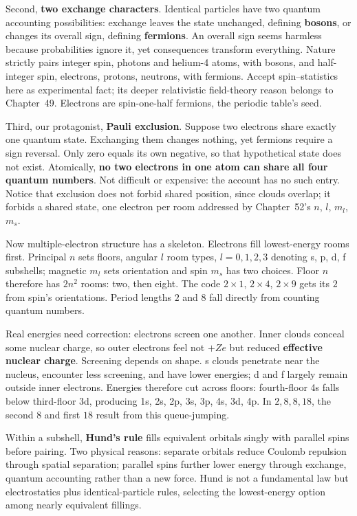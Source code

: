 Second, \textbf{two exchange characters}. Identical particles have two quantum accounting possibilities: exchange leaves the state unchanged, defining \textbf{bosons}, or changes its overall sign, defining \textbf{fermions}. An overall sign seems harmless because probabilities ignore it, yet consequences transform everything. Nature strictly pairs integer spin, photons and helium-4 atoms, with bosons, and half-integer spin, electrons, protons, neutrons, with fermions. Accept spin--statistics here as experimental fact; its deeper relativistic field-theory reason belongs to Chapter~49. Electrons are spin-one-half fermions, the periodic table's seed.

Third, our protagonist, \textbf{Pauli exclusion}. Suppose two electrons share exactly one quantum state. Exchanging them changes nothing, yet fermions require a sign reversal. Only zero equals its own negative, so that hypothetical state does not exist. Atomically, \textbf{no two electrons in one atom can share all four quantum numbers}. Not difficult or expensive: the account has no such entry. Notice that exclusion does not forbid shared position, since clouds overlap; it forbids a shared state, one electron per room addressed by Chapter~52's \(n\), \(l\), \(m_l\), \(m_s\).

Now multiple-electron structure has a skeleton. Electrons fill lowest-energy rooms first. Principal \(n\) sets floors, angular \(l\) room types, \(l=0,1,2,3\) denoting s, p, d, f subshells; magnetic \(m_l\) sets orientation and spin \(m_s\) has two choices. Floor \(n\) therefore has \(2n^2\) rooms: two, then eight. The code \(2\times1\), \(2\times4\), \(2\times9\) gets its \(2\) from spin's orientations. Period lengths \(2\) and \(8\) fall directly from counting quantum numbers.

Real energies need correction: electrons screen one another. Inner clouds conceal some nuclear charge, so outer electrons feel not \(+Ze\) but reduced \textbf{effective nuclear charge}. Screening depends on shape. s clouds penetrate near the nucleus, encounter less screening, and have lower energies; d and f largely remain outside inner electrons. Energies therefore cut across floors: fourth-floor 4s falls below third-floor 3d, producing 1s, 2s, 2p, 3s, 3p, 4s, 3d, 4p. In \(2,8,8,18\), the second \(8\) and first \(18\) result from this queue-jumping.

Within a subshell, \textbf{Hund's rule} fills equivalent orbitals singly with parallel spins before pairing. Two physical reasons: separate orbitals reduce Coulomb repulsion through spatial separation; parallel spins further lower energy through exchange, quantum accounting rather than a new force. Hund is not a fundamental law but electrostatics plus identical-particle rules, selecting the lowest-energy option among nearly equivalent fillings.

